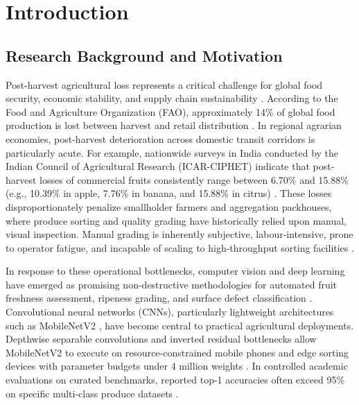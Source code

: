 \section{Introduction}
\label{sec:introduction}

\subsection{Research Background and Motivation}
\label{sec:background}
Post-harvest agricultural loss represents a critical challenge for global food security, economic stability, and supply chain sustainability \cite{fao2019state}. According to the Food and Agriculture Organization (FAO), approximately 14\% of global food production is lost between harvest and retail distribution \cite{fao2019state}. In regional agrarian economies, post-harvest deterioration across domestic transit corridors is particularly acute. For example, nationwide surveys in India conducted by the Indian Council of Agricultural Research (ICAR-CIPHET) indicate that post-harvest losses of commercial fruits consistently range between 6.70\% and 15.88\% (e.g., 10.39\% in apple, 7.76\% in banana, and 15.88\% in citrus) \cite{jha2015assessment}. These losses disproportionately penalize smallholder farmers and aggregation packhouses, where produce sorting and quality grading have historically relied upon manual, visual inspection. Manual grading is inherently subjective, labour-intensive, prone to operator fatigue, and incapable of scaling to high-throughput sorting facilities \cite{rizzo2023fruit,zhang2024fruit}.

In response to these operational bottlenecks, computer vision and deep learning have emerged as promising non-destructive methodologies for automated fruit freshness assessment, ripeness grading, and surface defect classification \cite{rizzo2023fruit,zhang2024fruit,chen2024classification,gulzar2023fruit}. Convolutional neural networks (CNNs), particularly lightweight architectures such as MobileNetV2 \cite{sandler2018mobilenetv2}, have become central to practical agricultural deployments. Depthwise separable convolutions and inverted residual bottlenecks allow MobileNetV2 to execute on resource-constrained mobile phones and edge sorting devices with parameter budgets under 4 million weights \cite{chen2024classification,sandler2018mobilenetv2}. In controlled academic evaluations on curated benchmarks, reported top-1 accuracies often exceed 95\% on specific multi-class produce datasets \cite{zhang2024fruit,chen2024classification,gulzar2023fruit}.

